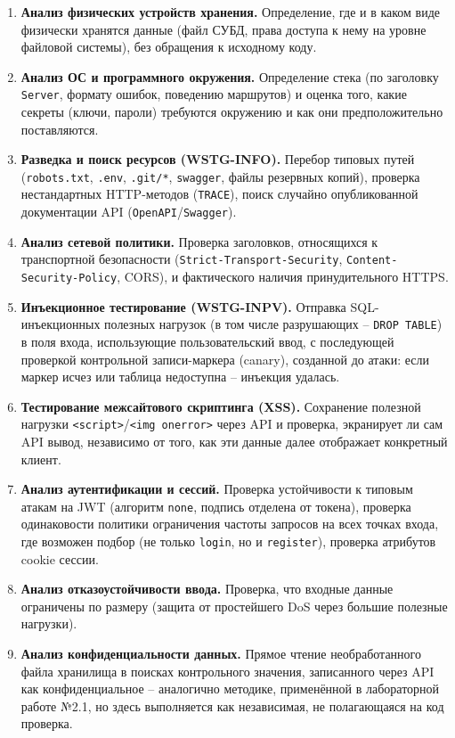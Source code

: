 \begin{enumerate}
  \item \textbf{Анализ физических устройств хранения.} Определение, где
  и в каком виде физически хранятся данные (файл СУБД, права доступа к
  нему на уровне файловой системы), без обращения к исходному коду.
  \item \textbf{Анализ ОС и программного окружения.} Определение стека
  (по заголовку \texttt{Server}, формату ошибок, поведению маршрутов) и
  оценка того, какие секреты (ключи, пароли) требуются окружению и как
  они предположительно поставляются.
  \item \textbf{Разведка и поиск ресурсов (WSTG-INFO).} Перебор типовых
  путей (\texttt{robots.txt}, \texttt{.env}, \texttt{.git/*},
  \texttt{swagger}, файлы резервных копий), проверка нестандартных
  HTTP-методов (\texttt{TRACE}), поиск случайно опубликованной
  документации API (\texttt{OpenAPI}/\texttt{Swagger}).
  \item \textbf{Анализ сетевой политики.} Проверка заголовков,
  относящихся к транспортной безопасности
  (\texttt{Strict-Transport-Security}, \texttt{Content-Security-Policy},
  CORS), и фактического наличия принудительного HTTPS.
  \item \textbf{Инъекционное тестирование (WSTG-INPV).} Отправка
  SQL-инъекционных полезных нагрузок (в том числе разрушающих --
  \texttt{DROP TABLE}) в поля входа, использующие пользовательский ввод,
  с последующей проверкой контрольной записи-маркера (canary), созданной
  до атаки: если маркер исчез или таблица недоступна -- инъекция удалась.
  \item \textbf{Тестирование межсайтового скриптинга (XSS).} Сохранение
  полезной нагрузки \texttt{<script>}/\texttt{<img onerror>} через API и
  проверка, экранирует ли сам API вывод, независимо от того, как эти
  данные далее отображает конкретный клиент.
  \item \textbf{Анализ аутентификации и сессий.} Проверка устойчивости к
  типовым атакам на JWT (алгоритм \texttt{none}, подпись отделена от
  токена), проверка одинаковости политики ограничения частоты запросов
  на всех точках входа, где возможен подбор (не только \texttt{login}, но
  и \texttt{register}), проверка атрибутов cookie сессии.
  \item \textbf{Анализ отказоустойчивости ввода.} Проверка, что
  входные данные ограничены по размеру (защита от простейшего DoS через
  большие полезные нагрузки).
  \item \textbf{Анализ конфиденциальности данных.} Прямое чтение
  необработанного файла хранилища в поисках контрольного значения,
  записанного через API как конфиденциальное -- аналогично методике,
  применённой в лабораторной работе №2.1, но здесь выполняется как
  независимая, не полагающаяся на код проверка.
\end{enumerate}

